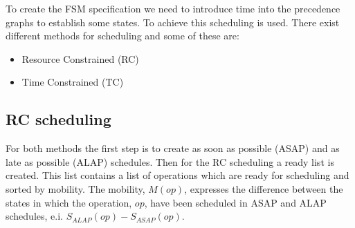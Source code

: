 To create the FSM specification we need to introduce time into the precedence graphs to establish some states. To achieve this scheduling is used. There exist different methods for scheduling and some of these are:
\begin{itemize}
  \item Resource Constrained (RC)
  \item Time Constrained (TC)
\end{itemize}

\subsection{RC scheduling}
For both methods the first step is to create as soon as possible (ASAP) and as late as possible (ALAP) schedules. Then for the RC scheduling a ready list is created. This list contains a list of operations which are ready for scheduling and sorted by mobility. The mobility, $M(op)$, expresses the difference between the states in which the operation, $op$, have been scheduled in ASAP and ALAP schedules, e.i. $S_{ALAP}(op) - S_{ASAP}(op)$.\\

